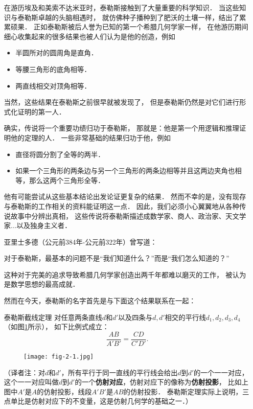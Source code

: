 \documentclass[cn,fancy,blue,11pt]{elegantbook}
\begin{document}
在游历埃及和美索不达米亚时，泰勒斯接触到了大量重要的科学知识．
当这些知识与泰勒斯卓越的头脑相遇时，
就仿佛种子播种到了肥沃的土壤一样，结出了累累硕果．
正如泰勒斯被后人誉为已知的第一个希腊几何学家一样，
在他游历期间细心收集起来的很多结果也被人们认为是他的创造，例如
\begin{itemize}
	\item 半圆所对的圆周角是直角．
	\item 等腰三角形的底角相等．
	\item 两直线相交对顶角相等．
\end{itemize}
当然，这些结果在泰勒斯之前很早就被发现了，
但是泰勒斯仍然是对它们进行形式化证明的第一人．

确实，传说将一个重要功绩归功于泰勒斯，
那就是：他是第一个用逻辑和推理证明他的定理的人．
一些非常基础的结果归功于他，例如
\begin{itemize}
	\item 直径将圆分割了全等的两半．
	\item 如果一个三角形的两条边与另一个三角形的两条边相等并且这两边夹角也相等，那么这两个三角形全等．
\end{itemize}
他有可能尝试从这些基本结论出发论证更复杂的结果．
然而不幸的是，没有现存与泰勒斯的工作相关的资料能证明这一点．
因此，我们必须小心翼翼地从各种传说故事中分辨出真相，
这些传说将泰勒斯描述成数学家、商人、政治家、天文学家...以及独身主义者．

亚里士多德（公元前384年-公元前322年）曾写道：
\begin{framed}
	对于泰勒斯，最基本的问题不是``我们知道什么？''而是``我们怎么知道的？''
\end{framed}
这种对于完美的追求导致希腊几何学家创造出两千年都难以磨灭的工作，
被认为是数学思想的最高成就．

然而在今天，泰勒斯的名字首先是与下面这个结果联系在一起：

\begin{theorem*}{泰勒斯截线定理}{}
	对任意两条直线$d$和$d'$以及四条与$d,d'$相交的平行线$d_1,d_2,d_3,d_4$（如图\ref{fig:2-1}所示），
	如下比例式成立：
	\[\frac{AB}{A'B'}=\frac{CD}{C'D'}.\]
\end{theorem*}

\begin{figure}[htbp]
	\centering
	\texttt{[image: fig-2-1.jpg]}
	\caption{\label{fig:2-1}}
\end{figure}

（译者注：对$d$和$d'$，所有平行于同一直线的平行线会给出$d$到$d'$的一个一一对应，
这个一一对应叫做$d$到$d'$的一个\textbf{仿射对应}，仿射对应下的像称为\textbf{仿射投影}，
比如上图中$A'$是$A$的仿射投影，线段$A'B'$是$AB$的仿射投影．
泰勒斯定理实际上说明，三点单比是仿射对应下的不变量，这是仿射几何学的基础之一．）
\vskip 10pt
\end{document}
